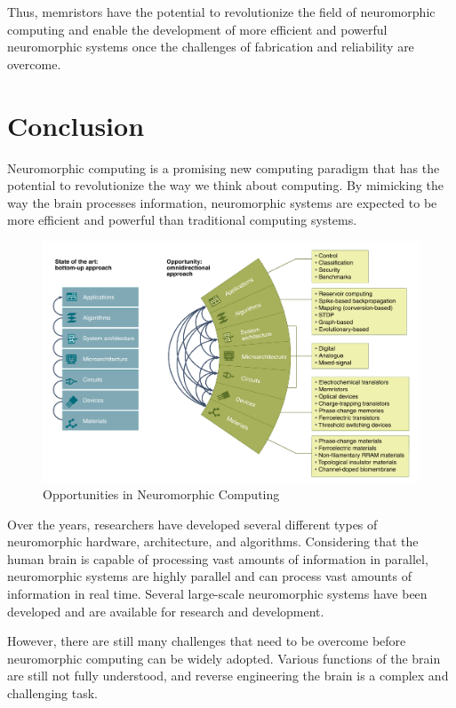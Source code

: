 \documentclass[screen, acmtog]{acmart}
\begin{document}
Thus, memristors have the potential to revolutionize the field of neuromorphic computing and enable the development of more efficient and powerful neuromorphic systems once the challenges of fabrication and reliability are overcome.

\section{Conclusion}

Neuromorphic computing is a promising new computing paradigm that has the potential to revolutionize the way we think about computing. By mimicking the way the brain processes information, neuromorphic systems are expected to be more efficient and powerful than traditional computing systems. 

\begin{figure}
    \centering
    \includegraphics[width=1\linewidth]{oppurtunities.png}
    \caption{Opportunities in Neuromorphic Computing \cite{NCalgo}}
    \label{fig:opportunities}
\end{figure}

Over the years, researchers have developed several different types of neuromorphic hardware, architecture, and algorithms. Considering that the human brain is capable of processing vast amounts of information in parallel, neuromorphic systems are highly parallel and can process vast amounts of information in real time. Several large-scale neuromorphic systems have been developed and are available for research and development.

However, there are still many challenges that need to be overcome before neuromorphic computing can be widely adopted. Various functions of the brain are still not fully understood, and reverse engineering the brain is a complex and challenging task. 
\end{document}
